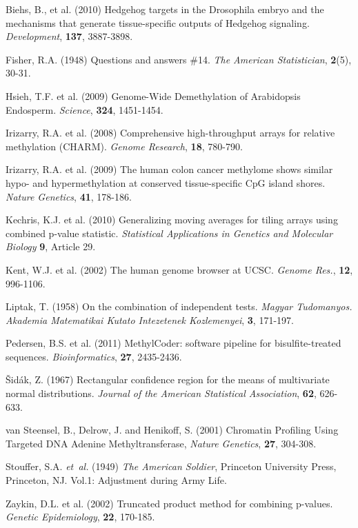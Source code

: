 \documentclass{bioinfo}
\begin{document}
\begin{thebibliography}{}
Biehs, B., et al. (2010)
Hedgehog targets in the Drosophila embryo and the mechanisms that generate tissue-specific outputs of Hedgehog signaling. {\it Development}, {\bf 137}, 3887-3898.

Fisher, R.A. (1948)
Questions and answers \#14.
{\it The American Statistician}, {\bf 2}(5), 30-31.

 Hsieh, T.F. et al. (2009)
Genome-Wide Demethylation of Arabidopsis Endosperm.
{\it Science}, {\bf 324}, 1451-1454.

 Irizarry, R.A. et al.
(2008) Comprehensive high-throughput arrays for relative methylation (CHARM).
{\it Genome Research}, {\bf 18}, 780-790.

 Irizarry, R.A. et al.
(2009) The human colon cancer methylome shows similar hypo- and
hypermethylation at conserved tissue-specific CpG island shores.
{\it Nature Genetics}, {\bf 41}, 178-186.

Kechris, K.J. et al. (2010)
Generalizing moving averages for tiling arrays using combined p-value
statistic. {\it Statistical Applications in Genetics and Molecular Biology}
{\bf 9}, Article 29.

 Kent, W.J. et al. (2002) The human genome browser at UCSC. {\it
Genome Res.}, {\bf 12}, 996-1106.

Liptak, T. (1958) On the combination of independent tests.
{\it Magyar Tudomanyos. Akademia Matematikai Kutato Intezetenek Kozlemenyei}, {\bf 3}, 171-197.

 Pedersen, B.S. et al.
(2011) MethylCoder: software pipeline for bisulfite-treated sequences.
{\it Bioinformatics}, {\bf 27}, 2435-2436.

\v{S}id\'{a}k, Z. (1967)
Rectangular confidence region for the means
 of multivariate normal distributions.
\textit{Journal of the American Statistical Association}, {\bf 62}, 626-633.

van Steensel, B., Delrow, J. and Henikoff, S. (2001)
Chromatin Profiling Using Targeted DNA Adenine Methyltransferase,
{\it Nature Genetics}, {\bf 27}, 304-308.

Stouffer, S.A. \textit{et~al.} (1949) \textit{The American Soldier},
Princeton University Press, Princeton, NJ. Vol.1: Adjustment during Army Life.

 Zaykin, D.L. et al. (2002)
Truncated product method for combining p-values. {\it Genetic Epidemiology},
{\bf 22}, 170-185.

\end{thebibliography}
\end{document}
